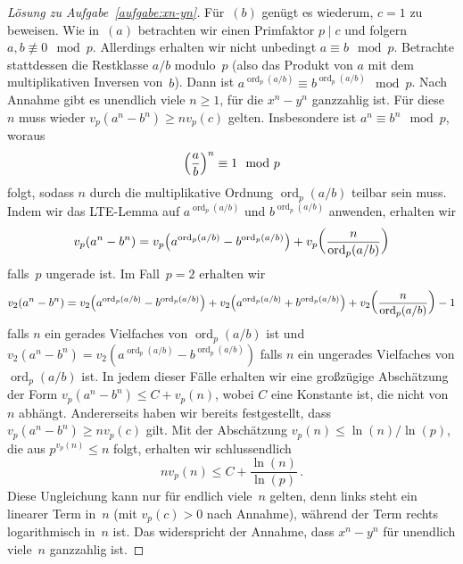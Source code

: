 \begin{proof}[Lösung zu Aufgabe~\ref{aufgabe:xn-yn}]
	Für~$(b)$ genügt es wiederum, $c=1$ zu beweisen. Wie in~$(a)$ betrachten wir einen Primfaktor $p\mid c$ und folgern $a,b\not\equiv 0\mod p$. Allerdings erhalten wir nicht unbedingt $a\equiv b\mod p$. Betrachte stattdessen die Restklasse $a/b$ modulo~$p$ (also das Produkt von $a$ mit dem multiplikativen Inversen von~$b$). Dann ist $a^{\operatorname{ord}_p(a/b)}\equiv b^{\operatorname{ord}_p(a/b)}\mod p$. Nach Annahme gibt es unendlich viele $n\geqslant 1$, für die $x^n-y^n$ ganzzahlig ist. Für diese~$n$ muss wieder $v_p(a^n-b^n)\geqslant nv_p(c)$ gelten. Insbesondere ist $a^n\equiv b^n\mod p$, woraus
	\begin{equation*}
		\parens*{\frac{a}{b}}^n\equiv 1\mod p
	\end{equation*}
	folgt, sodass $n$ durch die multiplikative Ordnung $\operatorname{ord}_p(a/b)$ teilbar sein muss. Indem wir das LTE-Lemma auf $a^{\operatorname{ord}_p(a/b)}$ und $b^{\operatorname{ord}_p(a/b)}$ anwenden, erhalten wir
	\begin{equation*}
		v_p\parens*{a^n-b^n}=v_p\parens*{a^{\operatorname{ord}_p(a/b)}- b^{\operatorname{ord}_p(a/b)}}+v_p\parens*{\frac{n}{\operatorname{ord}_p(a/b)}}
	\end{equation*}
	falls~$p$ ungerade ist. Im Fall~$p=2$ erhalten wir
	\begin{equation*}
		v_2\parens*{a^n-b^n}=v_2\parens*{a^{\operatorname{ord}_p(a/b)}- b^{\operatorname{ord}_p(a/b)}}+v_2\parens*{a^{\operatorname{ord}_p(a/b)}+ b^{\operatorname{ord}_p(a/b)}}+v_2\parens*{\frac{n}{\operatorname{ord}_p(a/b)}}-1
	\end{equation*}
	falls $n$ ein gerades Vielfaches von $\operatorname{ord}_p(a/b)$ ist und $v_2(a^n-b^n)=v_2(a^{\operatorname{ord}_p(a/b)}- b^{\operatorname{ord}_p(a/b)})$ falls $n$ ein ungerades Vielfaches von $\operatorname{ord}_p(a/b)$ ist. In jedem dieser Fälle erhalten wir eine großzügige Abschätzung der Form $v_p(a^n-b^n)\leqslant C+v_p(n)$, wobei $C$ eine Konstante ist, die nicht von~$n$ abhängt. Andererseits haben wir bereits festgestellt, dass $v_p(a^n-b^n)\geqslant nv_p(c)$ gilt. Mit der Abschätzung $v_p(n)\leqslant \ln(n)/\ln(p)$, die aus $p^{v_p(n)}\leqslant n$ folgt, erhalten wir schlussendlich
	\begin{equation*}
		nv_p(n)\leqslant C+\frac{\ln(n)}{\ln(p)}\,.
	\end{equation*}
	Diese Ungleichung kann nur für endlich viele~$n$ gelten, denn links steht ein linearer Term in~$n$ (mit $v_p(c)>0$ nach Annahme), während der Term rechts logarithmisch in~$n$ ist. Das widerspricht der Annahme, dass $x^n-y^n$ für unendlich viele~$n$ ganzzahlig ist.
\end{proof}

